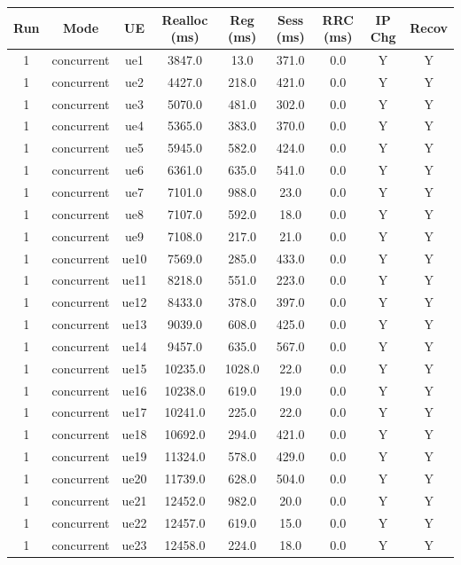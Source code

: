 \begin{table}[ht]
\centering
\begin{tabular}{|c|c|c|c|c|c|c|c|c|}
\hline
Run & Mode & UE & Realloc (ms) & Reg (ms) & Sess (ms) & RRC (ms) & IP Chg & Recov \\
\hline
1 & concurrent & ue1 & 3847.0 & 13.0 & 371.0 & 0.0 & Y & Y \\
1 & concurrent & ue2 & 4427.0 & 218.0 & 421.0 & 0.0 & Y & Y \\
1 & concurrent & ue3 & 5070.0 & 481.0 & 302.0 & 0.0 & Y & Y \\
1 & concurrent & ue4 & 5365.0 & 383.0 & 370.0 & 0.0 & Y & Y \\
1 & concurrent & ue5 & 5945.0 & 582.0 & 424.0 & 0.0 & Y & Y \\
1 & concurrent & ue6 & 6361.0 & 635.0 & 541.0 & 0.0 & Y & Y \\
1 & concurrent & ue7 & 7101.0 & 988.0 & 23.0 & 0.0 & Y & Y \\
1 & concurrent & ue8 & 7107.0 & 592.0 & 18.0 & 0.0 & Y & Y \\
1 & concurrent & ue9 & 7108.0 & 217.0 & 21.0 & 0.0 & Y & Y \\
1 & concurrent & ue10 & 7569.0 & 285.0 & 433.0 & 0.0 & Y & Y \\
1 & concurrent & ue11 & 8218.0 & 551.0 & 223.0 & 0.0 & Y & Y \\
1 & concurrent & ue12 & 8433.0 & 378.0 & 397.0 & 0.0 & Y & Y \\
1 & concurrent & ue13 & 9039.0 & 608.0 & 425.0 & 0.0 & Y & Y \\
1 & concurrent & ue14 & 9457.0 & 635.0 & 567.0 & 0.0 & Y & Y \\
1 & concurrent & ue15 & 10235.0 & 1028.0 & 22.0 & 0.0 & Y & Y \\
1 & concurrent & ue16 & 10238.0 & 619.0 & 19.0 & 0.0 & Y & Y \\
1 & concurrent & ue17 & 10241.0 & 225.0 & 22.0 & 0.0 & Y & Y \\
1 & concurrent & ue18 & 10692.0 & 294.0 & 421.0 & 0.0 & Y & Y \\
1 & concurrent & ue19 & 11324.0 & 578.0 & 429.0 & 0.0 & Y & Y \\
1 & concurrent & ue20 & 11739.0 & 628.0 & 504.0 & 0.0 & Y & Y \\
1 & concurrent & ue21 & 12452.0 & 982.0 & 20.0 & 0.0 & Y & Y \\
1 & concurrent & ue22 & 12457.0 & 619.0 & 15.0 & 0.0 & Y & Y \\
1 & concurrent & ue23 & 12458.0 & 224.0 & 18.0 & 0.0 & Y & Y \\

\end{tabular}
\end{table}
